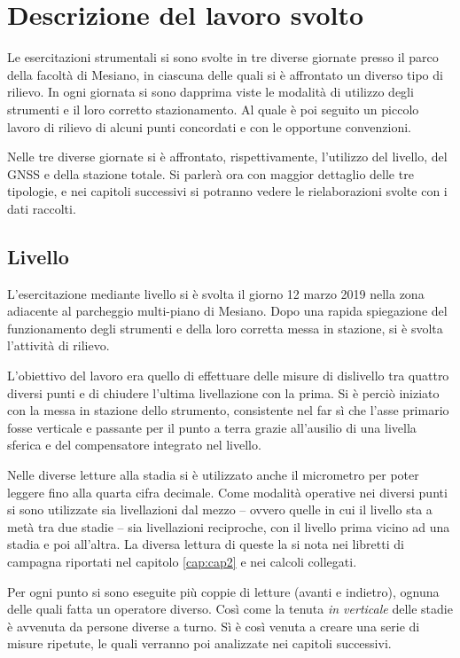 \chapter{Descrizione del lavoro svolto}
\setcounter{page}{1}
Le esercitazioni strumentali si sono svolte in tre diverse giornate presso il  parco della facoltà di Mesiano, in ciascuna delle quali si è affrontato un diverso tipo di rilievo.
In ogni giornata si sono dapprima viste le modalità di utilizzo degli strumenti e il loro corretto stazionamento.
Al quale è poi seguito un piccolo lavoro di rilievo di alcuni punti concordati e con le opportune convenzioni.

Nelle tre diverse giornate si è affrontato, rispettivamente, l'utilizzo del livello, del GNSS e della stazione totale. 
Si parlerà ora con maggior dettaglio delle tre tipologie, e nei capitoli successivi si potranno vedere le rielaborazioni svolte con i dati raccolti.
\section{Livello}
L'esercitazione mediante livello si è svolta il giorno 12 marzo 2019 nella zona adiacente al parcheggio multi-piano di Mesiano.
Dopo una rapida spiegazione del funzionamento degli strumenti e della loro corretta messa in stazione, si è svolta l'attività di rilievo. 

L'obiettivo del lavoro era quello di effettuare delle misure di dislivello tra quattro diversi punti e di chiudere l'ultima livellazione con la prima. 
Si è perciò iniziato con la messa in stazione dello strumento, consistente nel far sì che l'asse primario fosse verticale e passante per il punto a terra grazie all'ausilio di una livella sferica e del compensatore integrato nel livello.  

Nelle diverse letture alla stadia si è utilizzato anche il micrometro per poter leggere fino alla quarta cifra decimale.
Come modalità operative nei diversi punti si sono utilizzate sia livellazioni dal mezzo -- ovvero quelle in cui il livello sta a metà tra due stadie -- sia livellazioni reciproche, con il livello prima vicino ad una stadia e poi all'altra.
La diversa lettura di queste la si nota nei libretti di campagna riportati nel  capitolo \ref{cap:cap2} e nei calcoli collegati. 

Per ogni punto si sono eseguite più coppie di letture (avanti e indietro), ognuna delle quali fatta un operatore diverso. Così come la tenuta \emph{in verticale} delle stadie è avvenuta da persone diverse a turno. 
Sì è così venuta a creare una serie di misure ripetute, le quali verranno poi analizzate nei capitoli successivi.
